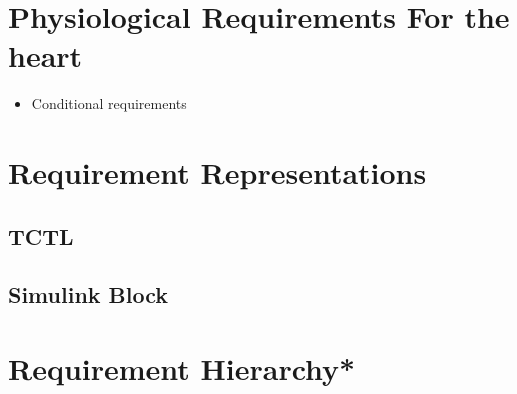 \section{Physiological Requirements For the heart}
\begin{itemize}
	\item Conditional requirements
\end{itemize}

\section{Requirement Representations}
\subsection{TCTL}
\subsection{Simulink Block}
 
\section{Requirement Hierarchy*}
